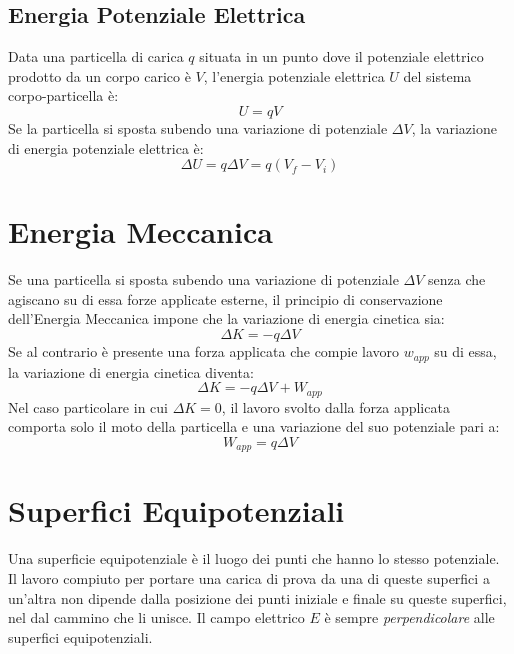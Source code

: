             \subsection{Energia Potenziale Elettrica} Data una particella di 
            carica $q$ situata in un punto dove il potenziale elettrico 
            prodotto da un corpo carico è $V$, l'energia potenziale elettrica
            $U$ del sistema corpo-particella è:
                \begin{equation}
                    U = qV
                \end{equation}
            Se la particella si sposta subendo una variazione di potenziale 
            $\Delta V$, la variazione di energia potenziale elettrica è:
                \begin{equation}
                    \Delta U = q \Delta V = q (V_f - V_i)
                \end{equation}
            
        \section{Energia Meccanica} Se una particella si sposta subendo una 
        variazione di potenziale $\Delta V$ senza che agiscano su di essa forze
        applicate esterne, il principio di conservazione dell'Energia Meccanica
        impone che la variazione di energia cinetica sia:
            \begin{equation}
                \Delta K = -q \Delta V
            \end{equation}
        Se al contrario è presente una forza applicata che compie lavoro 
        $w_{app}$ su di essa, la variazione di energia cinetica diventa:
            \begin{equation}
                \Delta K = -q\Delta V + W_{app}
            \end{equation}
        Nel caso particolare in cui $\Delta K = 0$, il lavoro svolto dalla 
        forza applicata comporta solo il moto della particella e una variazione
        del suo potenziale pari a:
            \begin{equation}
                W_{app} = q \Delta V
            \end{equation}

        \section{Superfici Equipotenziali} Una superficie equipotenziale è il 
        luogo dei punti che hanno lo stesso potenziale. Il lavoro compiuto per
        portare una carica di prova da una di queste superfici a un'altra non 
        dipende dalla posizione dei punti iniziale e finale su queste 
        superfici, nel dal cammino che li unisce. Il campo elettrico $E$ è 
        sempre \textit{perpendicolare} alle superfici equipotenziali.

